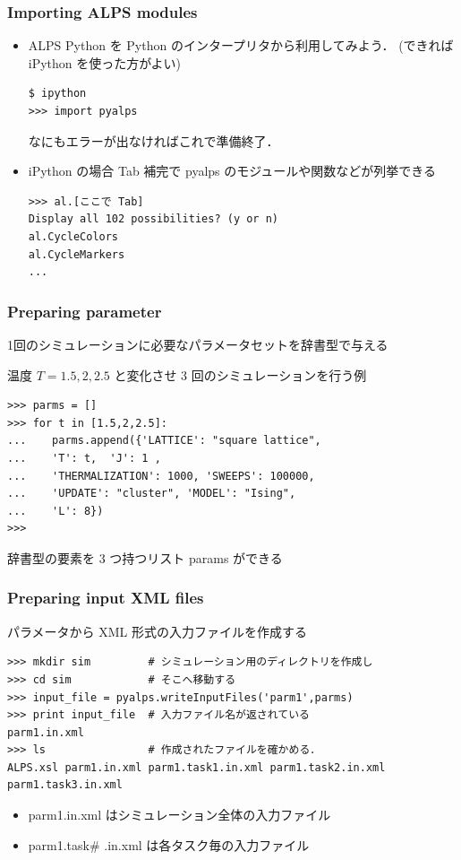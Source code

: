 \begin{frame}[t,fragile]
 \frametitle{Importing ALPS modules}

\begin{itemize}
 \item ALPS Python を Python のインタープリタから利用してみよう．
       (できれば iPython を使った方がよい)
       
\begin{lstlisting}
$ ipython
>>> import pyalps
\end{lstlisting}
       なにもエラーが出なければこれで準備終了．


 \item iPython の場合 Tab 補完で pyalps のモジュールや関数などが列挙できる

\begin{lstlisting}
>>> al.[ここで Tab]
Display all 102 possibilities? (y or n)
al.CycleColors   
al.CycleMarkers  
...            
\end{lstlisting}
\end{itemize}
 
\end{frame}


\begin{frame}[t,fragile]
\frametitle{Preparing parameter}

1回のシミュレーションに必要なパラメータセットを辞書型で与える


温度 $T = 1.5, 2, 2.5$ と変化させ 3 回のシミュレーションを行う例

\begin{lstlisting}
>>> parms = []
>>> for t in [1.5,2,2.5]:
...    parms.append({'LATTICE': "square lattice", 
...    'T': t,  'J': 1 ,
...    'THERMALIZATION': 1000, 'SWEEPS': 100000,
...    'UPDATE': "cluster", 'MODEL': "Ising",
...    'L': 8})
>>>
\end{lstlisting}

辞書型の要素を 3 つ持つリスト params ができる
\end{frame}

\begin{frame}[t,fragile]
\frametitle{Preparing input XML files}
パラメータから XML 形式の入力ファイルを作成する
\begin{lstlisting}
>>> mkdir sim         # シミュレーション用のディレクトリを作成し
>>> cd sim            # そこへ移動する
>>> input_file = pyalps.writeInputFiles('parm1',parms)
>>> print input_file  # 入力ファイル名が返されている
parm1.in.xml
>>> ls                # 作成されたファイルを確かめる．
ALPS.xsl parm1.in.xml parm1.task1.in.xml parm1.task2.in.xml parm1.task3.in.xml
\end{lstlisting}
\begin{itemize}
 \item parm1.in.xml はシミュレーション全体の入力ファイル
 \item parm1.task\# .in.xml は各タスク毎の入力ファイル
\end{itemize}

\end{frame}

